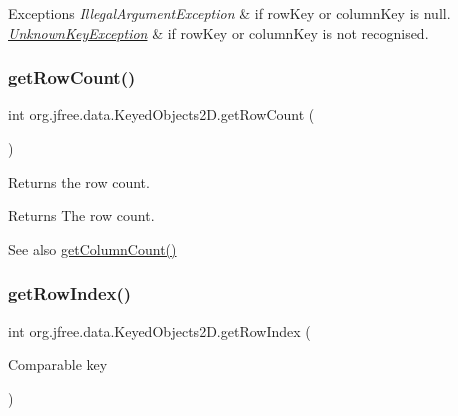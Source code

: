 \begin{DoxyExceptions}{Exceptions}
{\em Illegal\+Argument\+Exception} & if {\ttfamily row\+Key} or {\ttfamily column\+Key} is {\ttfamily null}. \\
\hline
{\em \mbox{\hyperlink{classorg_1_1jfree_1_1data_1_1_unknown_key_exception}{Unknown\+Key\+Exception}}} & if {\ttfamily row\+Key} or {\ttfamily column\+Key} is not recognised. \\
\hline
\end{DoxyExceptions}
\mbox{\label{classorg_1_1jfree_1_1data_1_1_keyed_objects2_d_acc38620c65b59e8ea4caa08e99901f53}} 
\subsubsection{\texorpdfstring{get\+Row\+Count()}{getRowCount()}}
{\footnotesize\ttfamily int org.\+jfree.\+data.\+Keyed\+Objects2\+D.\+get\+Row\+Count (\begin{DoxyParamCaption}{ }\end{DoxyParamCaption})}

Returns the row count.

\begin{DoxyReturn}{Returns}
The row count.
\end{DoxyReturn}
\begin{DoxySeeAlso}{See also}
\mbox{\hyperlink{classorg_1_1jfree_1_1data_1_1_keyed_objects2_d_a5278f36b18983c828dabc81392d30552}{get\+Column\+Count()}} 
\end{DoxySeeAlso}
\mbox{\label{classorg_1_1jfree_1_1data_1_1_keyed_objects2_d_aa1d3953e9bfcce6c2ec64fc38bbe380d}} 
\subsubsection{\texorpdfstring{get\+Row\+Index()}{getRowIndex()}}
{\footnotesize\ttfamily int org.\+jfree.\+data.\+Keyed\+Objects2\+D.\+get\+Row\+Index (\begin{DoxyParamCaption}\item[{Comparable}]{key }\end{DoxyParamCaption})}

